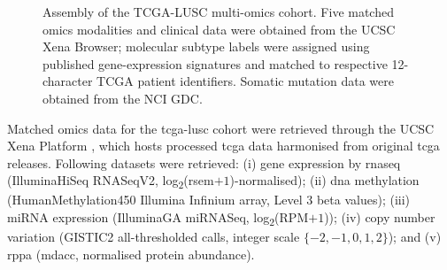 \begin{figure}[htbp]
{
}

\caption[Cohort assembly and data sources]{
  Assembly of the TCGA-LUSC multi-omics cohort. Five matched omics modalities and clinical data were obtained from the UCSC Xena Browser; molecular subtype labels were assigned using published gene-expression signatures and matched to respective 12-character TCGA patient identifiers. Somatic mutation data were obtained from the NCI GDC.
}
\label{fig:cohort_assembly_figure}
\end{figure}

Matched omics data for the \gls{tcga}-\gls{lusc} cohort were retrieved through the UCSC Xena Platform \parencite{Goldman2020}, which hosts processed \gls{tcga} data harmonised from original \gls{tcga} releases. Following datasets were retrieved: (i) gene expression by \gls{rnaseq} (IlluminaHiSeq RNASeqV2, log\textsubscript{2}(\gls{rsem}$+1$)-normalised); (ii) \gls{dna} methylation (HumanMethylation450 Illumina Infinium array, Level 3 beta values); (iii) miRNA expression (IlluminaGA miRNASeq, log\textsubscript{2}(RPM$+1$)); (iv) copy number variation (GISTIC2 all-thresholded calls, integer scale $\{-2, -1, 0, 1, 2\}$); and (v) \gls{rppa} (\gls{mdacc}, normalised protein abundance).

